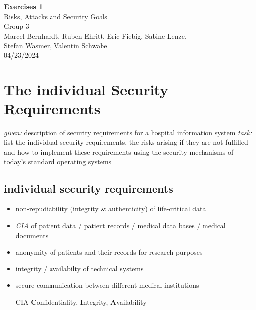 \documentclass[12pt]{article}
\begin{document}
\begin{titlepage}
    \centering
    \vspace*{1cm}
    {\Large\bfseries Exercises 1}\\[2ex]
    {\large Risks, Attacks and Security Goals}\\[0.5ex] 
    Group 3\\
    \vspace{2cm}
    Marcel Bernhardt, Ruben Ehritt, Eric Fiebig, Sabine Lenze, \\Stefan Wasmer, Valentin Schwabe\\
    \vspace{5ex}
    {\large 04/23/2024}\\
    \vspace{10ex}
    \tableofcontents
    \vfill
\end{titlepage}

\section{The individual Security Requirements}
\textit{given:} description of security requirements for a hospital information system
\textit{task:} list the individual security requirements, the risks arising if they are not fulfilled and how to implement these requirements using the security mechanisms of today's standard operating systems
\vspace{5ex}
\subsection{individual security requirements}
\begin{itemize}
    \item non-repudiability (integrity \& authenticity) of life-critical data
    \item \textit{CIA} of patient data / patient records / medical data bases / medical documents
    \item anonymity of patients and their records for research purposes
    \item integrity / availabilty of technical systems
    \item secure communication between different medical institutions
    \vspace{4ex}
    \item[CIA] \textbf{C}onfidentiality, \textbf{I}ntegrity, \textbf{A}vailability 
\end{itemize}

\newpage
\end{document}
